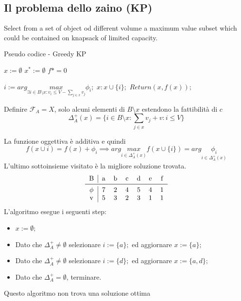 \documentclass{article}
\begin{document}
    \subsection{Il problema dello zaino (KP)}
    Select from a set of object od different volume a maximum value subset which could be contained
    on knapsack of limited capacity.
    \begin{algorithm}[H]
        \caption{Pseudo codice - Greedy KP}
        \begin{algorithmic}
            \State $x:=\emptyset$
            \State $x^*:=\emptyset$
            \State $f*=0$

            \State $i:=arg\underset{\exists i \in B\setminus x :v_i\leq V-\sum_{j\in x}v_j}{max}\phi_i;$
            \State $x:x\cup\{i\};$
            \EndWhile
            \State $Return(x,f(x));$
        \end{algorithmic}
    \end{algorithm}
    Definire $\mathcal{F}_A = X$, solo alcuni elementi di $B\setminus x$ estendono la fattibilità di $c$
    $$\Delta_A^+(x)=\{i\in B\setminus x:\sum_{j\in x}v_j+v : i \leq V\}$$

    La funzione oggettiva è additiva e quindi
    $$f(x\cup{i})=f(x)+\phi_i\implies arg\underset{i\in\Delta_A^+(x)}{max}f(x\cup\{i\})=arg\underset{i\in\Delta_A^+(x)}{\phi_i}$$
    L'ultimo sottoinsieme visitato è la migliore soluzione trovata.
    \[
        \begin{tabular}{c | c c c c c c c}
            B      & a & b & c & d & e & f \\
            \midrule
            $\phi$ & 7 & 2 & 4 & 5 & 4 & 1 \\
            v      & 5 & 3 & 2 & 3 & 1 & 1 \\
        \end{tabular}
    \]
    L'algoritmo esegue i seguenti step:
    \begin{itemize}
        \item $x:=\emptyset;$
        \item Dato che $\Delta_A^+\neq\emptyset$ selezionare $i:=\{a\};$ ed aggiornare $x:=\{a\};$
        \item Dato che $\Delta_A^+\neq\emptyset$ selezionare $i:=\{d\};$ ed aggiornare $x:=\{a,d\};$
        \item Dato che $\Delta_A^+ = \emptyset$, terminare.
    \end{itemize}
    Questo algoritmo non trova una soluzione ottima
\end{document}
